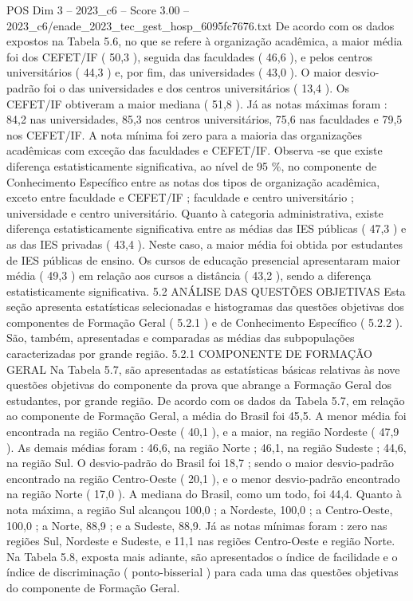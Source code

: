 \begin{textsample}{POS Dim 3 – 2023\_c6 – Score 3.00 – 2023\_c6/enade\_2023\_tec\_gest\_hosp\_6095fc7676.txt}
De acordo com os dados expostos na Tabela 5.6, no que se refere à organização acadêmica, a maior média foi dos CEFET/IF ( 50,3 ), seguida das faculdades ( 46,6 ), e pelos centros universitários ( 44,3 ) e, por fim, das universidades ( 43,0 ).
O maior desvio-padrão foi o das universidades e dos centros universitários ( 13,4 ).
Os CEFET/IF obtiveram a maior mediana ( 51,8 ).
Já as notas máximas foram : 84,2 nas universidades, 85,3 nos centros universitários, 75,6 nas faculdades e 79,5 nos CEFET/IF.
A nota mínima foi zero para a maioria das organizações acadêmicas com exceção das faculdades e CEFET/IF.
Observa -se que existe diferença estatisticamente significativa, ao nível de 95 \%, no componente de Conhecimento Específico entre as notas dos tipos de organização acadêmica, exceto entre faculdade e CEFET/IF ; faculdade e centro universitário ; universidade e centro universitário.
Quanto à categoria administrativa, existe diferença estatisticamente significativa entre as médias das IES públicas ( 47,3 ) e as das IES privadas ( 43,4 ).
Neste caso, a maior média foi obtida por estudantes de IES públicas de ensino.
Os cursos de educação presencial apresentaram maior média ( 49,3 ) em relação aos cursos a distância ( 43,2 ), sendo a diferença estatisticamente significativa. 5.2 ANÁLISE DAS QUESTÕES OBJETIVAS Esta seção apresenta estatísticas selecionadas e histogramas das questões objetivas dos componentes de Formação Geral ( 5.2.1 ) e de Conhecimento Específico ( 5.2.2 ).
São, também, apresentadas e comparadas as médias das subpopulações caracterizadas por grande região. 5.2.1 COMPONENTE DE FORMAÇÃO GERAL Na Tabela 5.7, são apresentadas as estatísticas básicas relativas às nove questões objetivas do componente da prova que abrange a Formação Geral dos estudantes, por grande região.
De acordo com os dados da Tabela 5.7, em relação ao componente de Formação Geral, a média do Brasil foi 45,5.
A menor média foi encontrada na região Centro-Oeste ( 40,1 ), e a maior, na região Nordeste ( 47,9 ).
As demais médias foram : 46,6, na região Norte ; 46,1, na região Sudeste ; 44,6, na região Sul.
O desvio-padrão do Brasil foi 18,7 ; sendo o maior desvio-padrão encontrado na região Centro-Oeste ( 20,1 ), e o menor desvio-padrão encontrado na região Norte ( 17,0 ).
A mediana do Brasil, como um todo, foi 44,4.
Quanto à nota máxima, a região Sul alcançou 100,0 ; a Nordeste, 100,0 ; a Centro-Oeste, 100,0 ; a Norte, 88,9 ; e a Sudeste, 88,9.
Já as notas mínimas foram : zero nas regiões Sul, Nordeste e Sudeste, e 11,1 nas regiões Centro-Oeste e região Norte.
Na Tabela 5.8, exposta mais adiante, são apresentados o índice de facilidade e o índice de discriminação ( ponto-bisserial ) para cada uma das questões objetivas do componente de Formação Geral.

\end{textsample}
